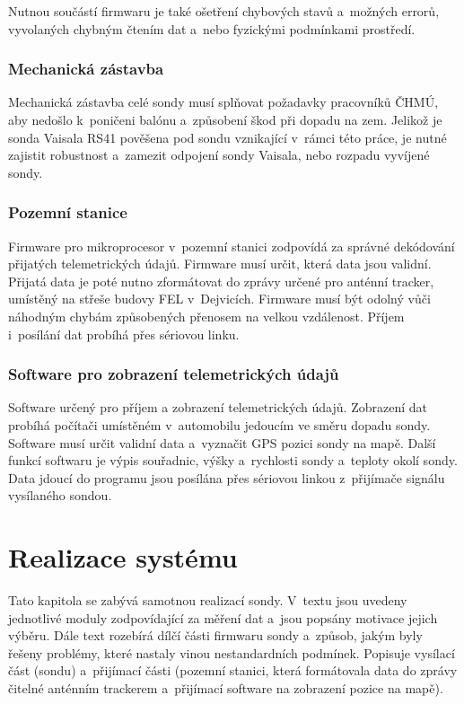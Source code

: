\documentclass[twoside]{ctuthesis}
\theoremstyle{plain}
\theoremstyle{definition}
\theoremstyle{note}
\begin{document}
		Nutnou součástí firmwaru je také ošetření chybových stavů a~možných errorů, vyvolaných chybným čtením dat a~nebo fyzickými podmínkami prostředí.

		\subsection{Mechanická zástavba}
		Mechanická zástavba celé sondy musí splňovat požadavky pracovníků ČHMÚ, aby nedošlo k~poničeni balónu a~způsobení škod při dopadu na zem. Jelikož je sonda Vaisala RS41 pověšena pod sondu vznikající v~rámci této práce, je nutné zajistit robustnost a~zamezit odpojení sondy Vaisala, nebo rozpadu vyvíjené sondy.



		\subsection{Pozemní stanice}
		\label{sec:navrh:pozemni_stanice}
		Firmware pro mikroprocesor v~pozemní stanici zodpovídá za správné dekódování přijatých telemetrických údajů. Firmware musí určit, která data jsou validní. Přijatá data je poté nutno zformátovat do zprávy určené pro anténní tracker, umístěný na střeše budovy FEL v~Dejvicích. Firmware musí být odolný vůči náhodným chybám způsobených přenosem na velkou vzdálenost. Příjem i~posílání dat probíhá přes sériovou linku. 



		\subsection{Software pro zobrazení telemetrických údajů}
		Software určený pro příjem a zobrazení telemetrických údajů. Zobrazení dat probíhá počítači umístěném v~automobilu jedoucím ve směru dopadu sondy. Software musí určit validní data a~vyznačit GPS pozici sondy na mapě. Další funkcí softwaru je výpis souřadnic, výšky a~rychlosti sondy a~teploty okolí sondy. Data jdoucí do programu jsou posílána přes sériovou linkou z~přijímače signálu vysílaného sondou. 




\chapter{Realizace systému}
Tato kapitola se zabývá samotnou realizací sondy. V~textu jsou uvedeny jednotlivé moduly zodpovídající za měření dat a~jsou popsány motivace jejich výběru. Dále text rozebírá dílčí části firmwaru sondy a~způsob, jakým byly řešeny problémy, které nastaly vinou nestandardních podmínek. Popisuje vysílací část (sondu) a~přijímací části (pozemní stanici, která formátovala data do zprávy čitelné anténním trackerem a~přijímací software na zobrazení pozice na mapě). 
\end{document}
